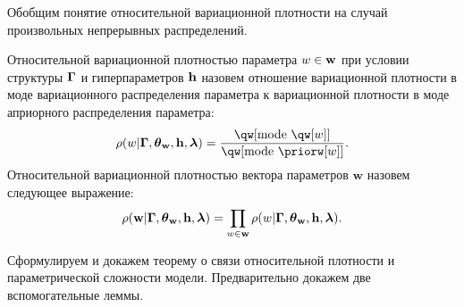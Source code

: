 Обобщим понятие относительной вариационной плотности на случай произвольных непрерывных распределений.
\begin{defin}
Относительной вариационной   плотностью параметра $w \in \mathbf{w}$  при условии структуры $\boldsymbol{\Gamma}$ и гиперпараметров $\mathbf{h}$ назовем отношение вариационной плотности в моде вариационного распределения параметра к вариационной плотности в моде априорного распределения параметра:
\[
\rho(w|\G,\tetaw, \h,\lam)=\frac{\qw[\text{mode}~\qw[w]]}{\qw[\text{mode}~{\priorw[w]}]}.
\]
Относительной вариационной плотностью вектора параметров $\mathbf{w}$ назовем следующее выражение:
\begin{equation}
\label{eq:rho_general}
    {\rho}(\mathbf{w}|\boldsymbol{\Gamma}, \boldsymbol{\theta}_\mathbf{w}, \mathbf{h},\boldsymbol{\lambda}) = \prod_{w \in \mathbf{w}}\rho(w|\boldsymbol{\Gamma},\boldsymbol{\theta}_\mathbf{w},\mathbf{h},\boldsymbol{\lambda}).
\end{equation}

\end{defin}

Сформулируем и докажем теорему о связи относительной плотности и параметрической сложности модели. Предварительно докажем две вспомогательные леммы.

